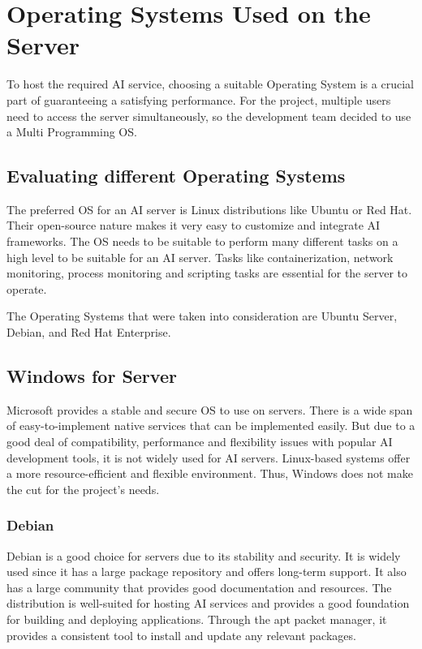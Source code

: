 \cite{Kernel}




\section {Operating Systems Used on the Server}

To host the required AI service, choosing a suitable Operating System is a crucial part of guaranteeing a satisfying performance.
For the project, multiple users need to access the server simultaneously, so the development team decided to use a Multi Programming OS.

\subsection {Evaluating different Operating Systems}

The preferred OS for an AI server is Linux distributions like Ubuntu or Red Hat.
Their open-source nature makes it very easy to customize and integrate AI frameworks.
The OS needs to be suitable to perform many different tasks on a high level to be suitable for an AI server. 
Tasks like containerization, network monitoring, process monitoring and scripting tasks are essential for the server to operate.


The Operating Systems that were taken into consideration are Ubuntu Server, Debian, and Red Hat Enterprise. 


\cite{cao2024managing}


\subsection{Windows for Server}

Microsoft provides a stable and secure OS to use on servers. There is a wide span of easy-to-implement native services that can be implemented easily.
But due to a good deal of compatibility, performance and flexibility issues with popular AI development tools, it is not widely used for AI servers. 
Linux-based systems offer a more resource-efficient and flexible environment. Thus, Windows does not make the cut for the project's needs.

\subsubsection{Debian}

Debian is a good choice for servers due to its stability and security. It is widely used since it has a large package repository and offers long-term support. It also has a large community that provides good documentation and resources. The distribution is well-suited for hosting AI services and provides a good foundation for building and deploying applications.
Through the apt packet manager, it provides a consistent tool to install and update any relevant packages.

